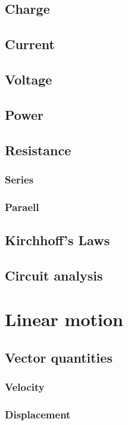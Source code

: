 \documentclass{book}
\begin{document}
\section{Charge}

\section{Current}

\section{Voltage}

\section{Power}

\section{Resistance}
\subsection{Series}

\subsection{Paraell}

\section{Kirchhoff's Laws}

\section{Circuit analysis}

\chapter{Linear motion}
\section{Vector quantities}
\subsection{Velocity}

\subsection{Displacement}
\end{document}
